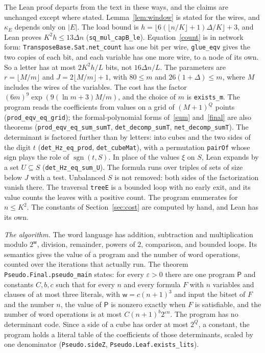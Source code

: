 \documentclass[11pt]{article}
\numberwithin{equation}{section}
\theoremstyle{remark}
\newcommand{\lean}[1]{\texttt{#1}}
\begin{document}
The Lean proof departs from the text in these ways, and the claims are unchanged except where stated. Lemma~\ref{lem:window} is stated for the wires, and $\kappa_E$ depends only on $|E|$. The load bound is $h=\lfloor6(\lfloor n/K\rfloor+1)\Delta/K\rfloor+3$, and Lean proves $K^2h\le13\Delta n$ (\lean{sq\_mul\_capB\_le}). Equation~\eqref{count} is in network form: \lean{TransposeBase.Sat.net\_count} has one bit per wire, \lean{glue\_eqv} gives the two copies of each bit, and each variable has one more wire, to a node of its own. So a letter has at most $2K^2h/L$ bits, not $16\Delta n/L$. The parameters are $r=\lfloor M/m\rfloor$ and $J=2\lfloor M/m\rfloor+1$, with $80\le m$ and $26(1+\Delta)\le m$, where $M$ includes the wires of the variables. The cost has the factor $(6m)^9\exp(9(\ln m+3)M/m)$, and the choice of $m$ is \lean{exists\_m}. The program reads the coefficients from values on a grid of $(M+1)^Q$ points (\lean{prod\_eqv\_eq\_grid}); the formal-polynomial forms of~\eqref{sum} and~\eqref{final} are also theorems (\lean{prod\_eqv\_eq\_sum\_sumT}, \lean{det\_decomp\_sumT}, \lean{net\_decomp\_sumT}). The determinant is factored further than by letters: into cubes and the two sides of the digit $t$ (\lean{det\_Hz\_eq\_prod}, \lean{det\_cubeMat}), with a permutation \lean{pairOf} whose sign plays the role of $\operatorname{sgn}(t,S)$. In place of the values $\xi$ on $S$, Lean expands by a set $U\subseteq S$ (\lean{det\_Hz\_eq\_sum\_U}). The formula runs over triples of sets of size below $J$ with a test. Unbalanced $S$ is not removed: both sides of the factorization vanish there. The traversal \lean{treeE} is a bounded loop with no early exit, and its value counts the leaves with a positive count. The program enumerates for $n\le K^2$. The constants of Section~\ref{sec:cost} are computed by hand, and Lean has its own.

\medskip\noindent\emph{The algorithm.} The word language has addition, subtraction and multiplication modulo $2^{\mathsf w}$, division, remainder, powers of $2$, comparison, and bounded loops. Its semantics gives the value of a program and the number of word operations, counted over the iterations that actually run. The theorem \lean{Pseudo.Final.pseudo\_main} states: for every $\varepsilon>0$ there are one program $\mathsf P$ and constants $C,b,c$ such that for every $n$ and every formula $F$ with $n$ variables and clauses of at most three literals, with $\mathsf w=c(n+1)^3$ and input the bitset of $F$ and the number $n$, the value of $\mathsf P$ is nonzero exactly when $F$ is satisfiable, and the number of word operations is at most $C(n+1)^b2^{\varepsilon n}$. The program has no determinant code. Since a side of a cube has order at most $2^Q$, a constant, the program holds a literal table of the coefficients of those determinants, scaled by one denominator (\lean{Pseudo.sideZ}, \lean{Pseudo.Leaf.exists\_lits}).
\end{document}
